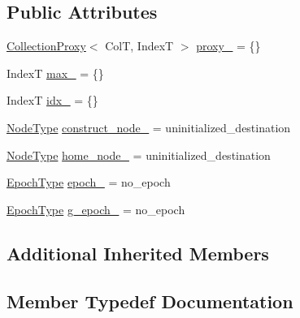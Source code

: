 \subsection*{Public Attributes}
\begin{DoxyCompactItemize}
\item 
\hyperlink{structvt_1_1vrt_1_1collection_1_1_collection_proxy}{Collection\+Proxy}$<$ ColT, IndexT $>$ \hyperlink{structvt_1_1vrt_1_1collection_1_1_insert_msg_a7f679b8e031239c31fe8061e9a18f568}{proxy\+\_\+} = \{\}
\item 
IndexT \hyperlink{structvt_1_1vrt_1_1collection_1_1_insert_msg_a8e6cba1aa922c74d219db407343530b1}{max\+\_\+} = \{\}
\item 
IndexT \hyperlink{structvt_1_1vrt_1_1collection_1_1_insert_msg_a34ee4c02fcf0ae389eb0f11a44033ccc}{idx\+\_\+} = \{\}
\item 
\hyperlink{namespacevt_a866da9d0efc19c0a1ce79e9e492f47e2}{Node\+Type} \hyperlink{structvt_1_1vrt_1_1collection_1_1_insert_msg_a58fd21706a7cf67fc92d19facb9b260a}{construct\+\_\+node\+\_\+} = uninitialized\+\_\+destination
\item 
\hyperlink{namespacevt_a866da9d0efc19c0a1ce79e9e492f47e2}{Node\+Type} \hyperlink{structvt_1_1vrt_1_1collection_1_1_insert_msg_a0ab2ebbf58c63307eb4b7e0794cd60d8}{home\+\_\+node\+\_\+} = uninitialized\+\_\+destination
\item 
\hyperlink{namespacevt_a985a5adf291c34a3ca263b3378388236}{Epoch\+Type} \hyperlink{structvt_1_1vrt_1_1collection_1_1_insert_msg_adb7966a80d37bddff7a1d1e3eaba880e}{epoch\+\_\+} = no\+\_\+epoch
\item 
\hyperlink{namespacevt_a985a5adf291c34a3ca263b3378388236}{Epoch\+Type} \hyperlink{structvt_1_1vrt_1_1collection_1_1_insert_msg_a7d080a6dc4e89607097f79e751dbbd70}{g\+\_\+epoch\+\_\+} = no\+\_\+epoch
\end{DoxyCompactItemize}
\subsection*{Additional Inherited Members}


\subsection{Member Typedef Documentation}
\mbox{\label{structvt_1_1vrt_1_1collection_1_1_insert_msg_a04da6eeb695c98c1bb15837cfa2984c0}} 
